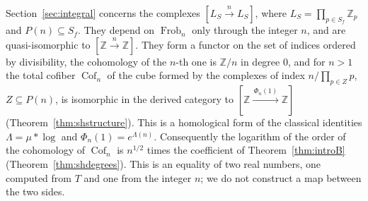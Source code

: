 \documentclass[11pt]{amsart}
\theoremstyle{definition}
\newcommand{\Z}{\mathbb Z}
\newcommand{\Frob}{\operatorname{Frob}}
\newcommand{\Prim}{\operatorname{Cof}}
\begin{document}
Section~\ref{sec:integral} concerns the complexes
$[L_S\xrightarrow{\,n\,}L_S]$, where $L_S=\prod_{p\in S_f}\Z_p$ and
$P(n)\subseteq S_f$. They depend on $\Frob_n$ only through the integer $n$,
and are quasi-isomorphic to $[\Z\xrightarrow{\,n\,}\Z]$. They form a functor
on the set of indices ordered by divisibility, the cohomology of the $n$-th
one is $\Z/n$ in degree $0$, and for $n>1$ the total cofiber $\Prim_n$ of the
cube formed by the complexes of index $n/\prod_{p\in Z}p$,
$Z\subseteq P(n)$, is isomorphic in the derived category to
$[\Z\xrightarrow{\,\Phi_n(1)\,}\Z]$ (Theorem~\ref{thm:shstructure}). This is
a homological form of the classical identities
$\Lambda=\mu*\log$ and $\Phi_n(1)=e^{\Lambda(n)}$. Consequently the
logarithm of the order of the cohomology of $\Prim_n$ is $n^{1/2}$ times the
coefficient of Theorem~\ref{thm:introB} (Theorem~\ref{thm:shdegrees}). This
is an equality of two real numbers, one computed from $T$ and one from the
integer $n$; we do not construct a map between the two sides.
\end{document}
